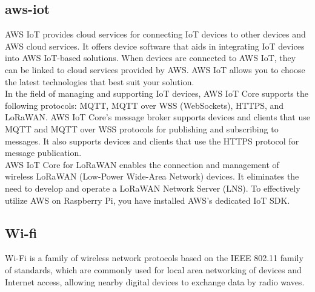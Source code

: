 \subsection{\textbf{aws-iot}}
\cite{awsiot}
AWS IoT provides cloud services for connecting IoT devices to other devices and AWS cloud services. It offers device software that aids in integrating IoT devices into AWS IoT-based solutions. When devices are connected to AWS IoT, they can be linked to cloud services provided by AWS. AWS IoT allows you to choose the latest technologies that best suit your solution.
\\

In the field of managing and supporting IoT devices, AWS IoT Core supports the following protocols: MQTT, MQTT over WSS (WebSockets), HTTPS, and LoRaWAN. AWS IoT Core's message broker supports devices and clients that use MQTT and MQTT over WSS protocols for publishing and subscribing to messages. It also supports devices and clients that use the HTTPS protocol for message publication.
\\

AWS IoT Core for LoRaWAN enables the connection and management of wireless LoRaWAN (Low-Power Wide-Area Network) devices. It eliminates the need to develop and operate a LoRaWAN Network Server (LNS). To effectively utilize AWS on Raspberry Pi, you have installed AWS's dedicated IoT SDK.\\

\subsection{\textbf{Wi-fi}}
\cite{wifi} Wi-Fi is a family of wireless network protocols based on the IEEE 802.11 family of standards, which are commonly used for local area networking of devices and Internet access, allowing nearby digital devices to exchange data by radio waves. 
\\

